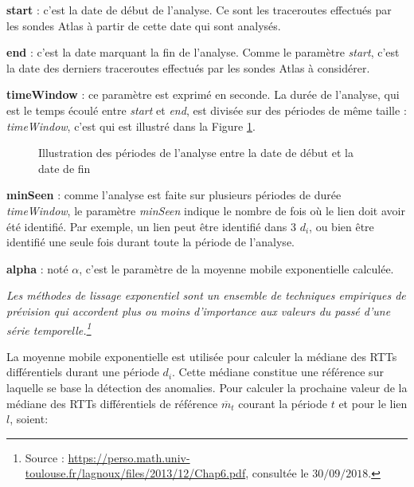 \textbf{start} : c'est la date de début de l'analyse. Ce sont les traceroutes effectués par les sondes Atlas à partir de cette date qui sont analysés.

\textbf{end} : c'est la date marquant la fin de l'analyse. Comme le paramètre \textit{start}, c'est la date des derniers traceroutes effectués par les sondes Atlas à considérer.

\textbf{timeWindow} :  ce paramètre est exprimé en seconde. La durée de l'analyse, qui est le temps écoulé entre \textit{start} et \textit{end}, est divisée sur des périodes de même taille : \textit{timeWindow}, c'est qui est illustré dans la Figure  \ref{fig:timing_tex}.




\begin{figure}[h]
	\centering
	\captionsetup{justification=centering}
	
	\caption{Illustration des périodes de l'analyse entre la date de début et la date de fin}
	\label{fig:timing_tex}
\end{figure}
%		 

\textbf{minSeen} : comme l'analyse est faite sur plusieurs périodes de durée \textit{timeWindow}, le paramètre \textit{minSeen} indique le nombre de fois où le lien doit avoir été identifié. Par exemple, un lien peut être identifié dans $3$ $d_i$, ou bien être identifié  une seule fois durant toute la période de l'analyse.

\textbf{alpha }: noté $\alpha$, c'est le paramètre de la  moyenne mobile exponentielle calculée.

\guillemotleft \textit{ Les méthodes de lissage exponentiel  sont un ensemble de techniques empiriques de prévision qui accordent plus ou moins d'importance aux valeurs du passé d'une série temporelle.\footnote{Source : \url{https://perso.math.univ-toulouse.fr/lagnoux/files/2013/12/Chap6.pdf}, consultée le $30/09/2018.$}} \guillemotright

 La  moyenne mobile exponentielle est utilisée pour calculer la médiane des RTTs différentiels durant une période $d_i$. Cette médiane constitue une référence  sur laquelle se base la détection des anomalies.
Pour calculer la prochaine  valeur de la médiane des RTTs différentiels de référence $ \overline{m}_{t}$   courant la période $ t $ et pour le lien $l$, soient: 

